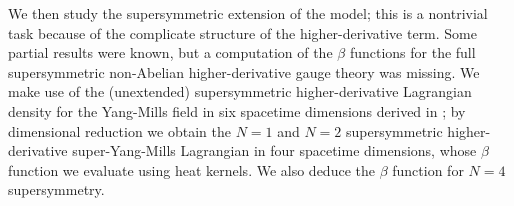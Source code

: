 \documentclass[10pt,a4paper,openany]{book}
\newcommand{\ym}{Yang-Mills}
\newcommand{\1}{ { \mathbbm{1} } }
\numberwithin{equation}{section} %
\begin{document}
We then study the supersymmetric extension of the model; this is a nontrivial task because of the complicate structure of the higher-derivative term.
Some partial results were known, but a computation of the $\beta$ functions for the full supersymmetric non-Abelian higher-derivative gauge theory was missing.
We make use of the (unextended) supersymmetric higher-derivative Lagrangian density for the \ym{} field in six spacetime dimensions derived in 
\cite{Ivanov:2005qf}; by dimensional reduction we obtain the $N=1$ and $N=2$ supersymmetric higher-derivative super-Yang-Mills  Lagrangian in four spacetime dimensions, whose $\beta$ function we evaluate using heat kernels. We also deduce the $\beta$ function  for $N=4$ supersymmetry.






\tableofcontents\markboth{}{} 

\pagestyle{plain}





















	\newpage
	\pagestyle{plain}



	\newpage
	\pagestyle{plain}





\appendix


\renewcommand\chaptername{Appendix}




	\fancyfoot[CE,CO]{\thepage}
	\fancyfoot[LO,RO]{ }
	\fancyfoot[LE,RE]{ }




	\fancyfoot[CE,CO]{\thepage}
	\fancyfoot[LO,RO]{ }
	\fancyfoot[LE,RE]{ }
	
	

\end{document}
